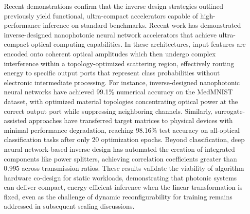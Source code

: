 \documentclass[11pt]{article}
\begin{document}
Recent demonstrations confirm that the inverse design strategies outlined previously yield functional, ultra-compact accelerators capable of high-performance inference on standard benchmarks. Recent work has demonstrated inverse-designed nanophotonic neural network accelerators that achieve ultra-compact optical computing capabilities. \citep{doi_10_1038_s41467_026_68648_1_26658a9c} In these architectures, input features are encoded onto coherent optical amplitudes which then undergo complex interference within a topology-optimized scattering region, effectively routing energy to specific output ports that represent class probabilities without electronic intermediate processing. For instance, inverse-designed nanophotonic neural networks have achieved 99.1\% numerical accuracy on the MedMNIST dataset, with optimized material topologies concentrating optical power at the correct output port while suppressing neighboring channels. Similarly, surrogate-assisted approaches have transferred target matrices to physical devices with minimal performance degradation, reaching 98.16\% test accuracy on all-optical classification tasks after only 20 optimization epochs. Beyond classification, deep neural network-based inverse design has automated the creation of integrated components like power splitters, achieving correlation coefficients greater than 0.995 across transmission ratios. These results validate the viability of algorithm-hardware co-design for static workloads, demonstrating that photonic systems can deliver compact, energy-efficient inference when the linear transformation is fixed, even as the challenge of dynamic reconfigurability for training remains addressed in subsequent scaling discussions. \citep{doi_10_1038_s41467_026_68648_1_26658a9c} \citep{s2_753a5d83a96e0194da93bcb6f20fa0bd356e37fa_c11e3796} \citep{s2_0482241c1bd933adb55a6674133d1688626bdab1_17e7627d}
\end{document}
